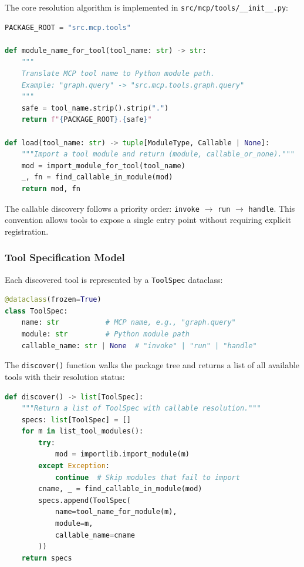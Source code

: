 The core resolution algorithm is implemented in \texttt{src/mcp/tools/\_\_init\_\_.py}:

\begin{lstlisting}[language=Python, caption={Tool module resolution algorithm}, label={lst:tool-resolution}]
PACKAGE_ROOT = "src.mcp.tools"

def module_name_for_tool(tool_name: str) -> str:
    """
    Translate MCP tool name to Python module path.
    Example: "graph.query" -> "src.mcp.tools.graph.query"
    """
    safe = tool_name.strip().strip(".")
    return f"{PACKAGE_ROOT}.{safe}"

def load(tool_name: str) -> tuple[ModuleType, Callable | None]:
    """Import a tool module and return (module, callable_or_none)."""
    mod = import_module_for_tool(tool_name)
    _, fn = find_callable_in_module(mod)
    return mod, fn
\end{lstlisting}

The callable discovery follows a priority order: \texttt{invoke} $\rightarrow$ \texttt{run} $\rightarrow$ \texttt{handle}. This convention allows tools to expose a single entry point without requiring explicit registration.

\subsubsection{Tool Specification Model}

Each discovered tool is represented by a \texttt{ToolSpec} dataclass:

\begin{lstlisting}[language=Python, caption={ToolSpec dataclass for tool metadata}, label={lst:toolspec}]
@dataclass(frozen=True)
class ToolSpec:
    name: str           # MCP name, e.g., "graph.query"
    module: str         # Python module path
    callable_name: str | None  # "invoke" | "run" | "handle"
\end{lstlisting}

The \texttt{discover()} function walks the package tree and returns a list of all available tools with their resolution status:

\begin{lstlisting}[language=Python, caption={Tool discovery mechanism}, label={lst:tool-discovery}]
def discover() -> list[ToolSpec]:
    """Return a list of ToolSpec with callable resolution."""
    specs: list[ToolSpec] = []
    for m in list_tool_modules():
        try:
            mod = importlib.import_module(m)
        except Exception:
            continue  # Skip modules that fail to import
        cname, _ = find_callable_in_module(mod)
        specs.append(ToolSpec(
            name=tool_name_for_module(m),
            module=m,
            callable_name=cname
        ))
    return specs
\end{lstlisting}

